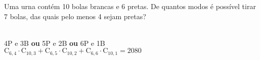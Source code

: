 \begin{ex}
Uma urna contém 10 bolas brancas e 6 pretas. De quantos modos é possível tirar 7 bolas, das quais pelo menos 4 sejam pretas?
 \begin{sol}
 \phantom{A}\\
4P e 3B \textbf{ou} 5P e 2B \textbf{ou} 6P e 1B \\
$\mathrm{C}_{6,4}\cdot \mathrm{C}_{{10},3}+\mathrm{C}_{6,5}\cdot \mathrm{C}_{{10},2}+\mathrm{C}_{6,6}\cdot \mathrm{C}_{{10},1}=2080$
 \end{sol}
\end{ex}